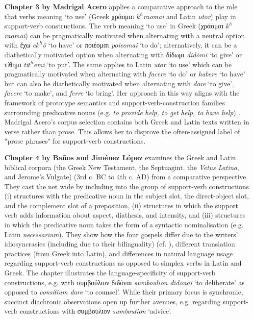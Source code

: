 \documentclass[output=paper,colorlinks,citecolor=brown]{langscibook}
\begin{document}
\textbf{Chapter 3 by Madrigal Acero} applies a comparative approach to the role that verbs meaning ‘to use’ (Greek χράομαι \textit{$k^{h}$raomai} and Latin \textit{utor}) play in support-verb constructions. The verb meaning ‘to use’ in Greek (χράομαι \textit{$k^{h}$raomai}) can be pragmatically motivated when alternating with a neutral option with ἔχω \textit{e$k^{h}$ō} ‘to have’ or ποιέομαι \textit{poieomai} ‘to do’; alternatively, it can be a diathetically motivated option when alternating with δίδωμι \textit{didōmi} ‘to give’ or τίθημι \textit{ti$t^{h}$ēmi} ‘to put’. The same applies to Latin \textit{utor} ‘to use’ which can be pragmatically motivated when alternating with \textit{facere} ‘to do’ or \textit{habere} ‘to have’ but can also be diathetically motivated when alternating with \textit{dare} ‘to give’, \textit{facere} ‘to make’, and \textit{ferre} ‘to bring’. Her approach in this way aligns with the framework of prototype semantics and support-verb-construction families surrounding predicative nouns (e.g. \textit{to provide help, to get help, to have help}) \citep{kamberFunktionsverbgefugeEmpirischKorpusbasierte2008}. Madrigal Acero’s corpus selection contains both Greek and Latin texts written in verse rather than prose. This allows her to disprove the often-assigned label of ‟prose phrases" for support-verb constructions.


\textbf{Chapter 4 by Baños and Jiménez López} examines the Greek and Latin biblical corpora (the Greek New Testament, the Septuagint, the \textit{Vetus Latina}, and Jerome’s Vulgate) (3rd c. BC to 4th c. AD) from a comparative perspective. They cast the net wide by including into the group of support-verb constructions (i) structures with the predicative noun in the subject slot, the direct-object slot, and the complement slot of a preposition, (ii) structures in which the support verb adds information about aspect, diathesis, and intensity, and (iii) structures in which the predicative noun takes the form of a syntactic nominalisation (e.g. Latin \textit{necessarium}). They show how the four gospels differ due to the writers’ idiosyncrasies (including due to their bilinguality) (cf. \citealt{hamersBilingualityBilingualism2000}), different translation practices (from Greek into Latin), and differences in natural language usage regarding support-verb constructions as opposed to simplex verbs in Latin and Greek. The chapter illustrates the language-specificity of support-verb constructions, e.g. with συμβούλιον διδόναι \textit{sumboulion didonai} ‘to deliberate’ as opposed to \textit{consilium dare} ‘to counsel’. While their primary focus is synchronic, succinct diachronic observations open up further avenues, e.g. regarding support-verb constructions with συμβούλιον \textit{sumboulion} ‘advice’. 
\end{document}
